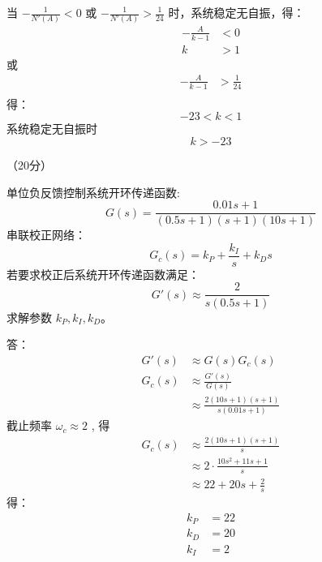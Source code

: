 {{		当 $-\frac{1}{N'(A)}<0$ 或 $-\frac{1}{N'(A)}>\frac{1}{24}$ 时，系统稳定无自振，得：
		\begin{align*}
		-\frac{A}{k-1} &< 0 \\
		k&>1 
		\end{align*}
		或
		\begin{align*}
		-\frac{A}{k-1} &>\frac{1}{24} \\
		\end{align*}
		得：
			$$ -23<k<1$$ 
		系统稳定无自振时 
		$$k>-23$$
		
		
	}
}


\question（20分）{单位负反馈控制系统开环传递函数:
	$$G(s)=\frac{0.01s+1}{(0.5s+1)(s+1)(10s+1)}$$
	串联校正网络：
	$$G_c(s)=k_P +\frac{k_I}{s}+k_D s$$
	若要求校正后系统开环传递函数满足：
	$$G'(s)\approx\frac{2}{s(0.5s+1)}$$
	求解参数 $k_P,k_I,k_D$。
	
	\onlyanswer
	{
		答：
		\begin{align*}
		G'(s)&\approx G(s)G_c(s)\\
		G_c(s)&\approx \frac{G'(s)}{G(s)}\\
		&\approx \frac{2(10s+1)(s+1)}{s(0.01s+1)}
		\end{align*}
		截止频率 $\omega_c \approx 2$ , 得
		\begin{align*}
		G_c(s)&\approx \frac{2(10s+1)(s+1)}{s}\\
		&\approx 2\cdot \frac{10s^2+11s+1}{s}\\
		&\approx 22+20s+\frac{2}{s}
		\end{align*}
		得：
		\begin{align*}
		k_P&=22\\
		k_D&=20\\
		k_I&=2
		\end{align*}
	}
}


